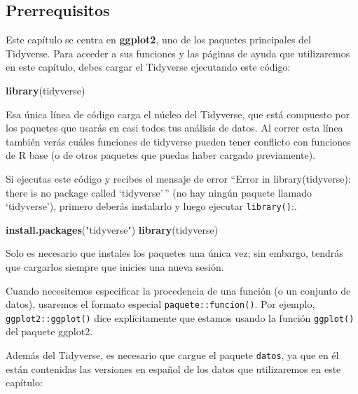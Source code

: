 \documentclass[11pt,oneside]{report}
\newenvironment{Shaded}{\begin{snugshade}}{\end{snugshade}}
\newcommand{\KeywordTok}[1]{\textcolor[rgb]{0.13,0.29,0.53}{\textbf{#1}}}
\newcommand{\NormalTok}[1]{#1}
\newcommand{\StringTok}[1]{\textcolor[rgb]{0.31,0.60,0.02}{#1}}
\begin{document}
\hypertarget{prerrequisitos-1}{%
\subsection{Prerrequisitos}\label{prerrequisitos-1}}

Este capítulo se centra en \textbf{ggplot2}, uno de los paquetes
principales del Tidyverse. Para acceder a sus funciones y las páginas de
ayuda que utilizaremos en este capítulo, debes cargar el Tidyverse
ejecutando este código:

\begin{Shaded}
\begin{Highlighting}[]
\KeywordTok{library}\NormalTok{(tidyverse)}
\end{Highlighting}
\end{Shaded}

Esa única línea de código carga el núcleo del Tidyverse, que está
compuesto por los paquetes que usarás en casi todos tus análisis de
datos. Al correr esta línea también verás cuáles funciones de tidyverse
pueden tener conflicto con funciones de R base (o de otros paquetes que
puedas haber cargado previamente).

Si ejecutas este código y recibes el mensaje de error ``Error in
library(tidyverse): there is no package called `tidyverse'\,'' (no hay
ningún paquete llamado `tidyverse'), primero deberás instalarlo y luego
ejecutar \texttt{library()}:.

\begin{Shaded}
\begin{Highlighting}[]
\KeywordTok{install.packages}\NormalTok{(}\StringTok{"tidyverse"}\NormalTok{)}
\KeywordTok{library}\NormalTok{(tidyverse)}
\end{Highlighting}
\end{Shaded}

Solo es necesario que instales los paquetes una única vez; sin embargo,
tendrás que cargarlos siempre que inicies una nueva sesión.

Cuando necesitemos especificar la procedencia de una función (o un
conjunto de datos), usaremos el formato especial
\texttt{paquete::funcion()}. Por ejemplo, \texttt{ggplot2::ggplot()}
dice explícitamente que estamos usando la función \texttt{ggplot()} del
paquete ggplot2.

Además del Tidyverse, es necesario que cargue el paquete \texttt{datos},
ya que en él están contenidas las versiones en español de los datos que
utilizaremos en este capítulo:
\end{document}
